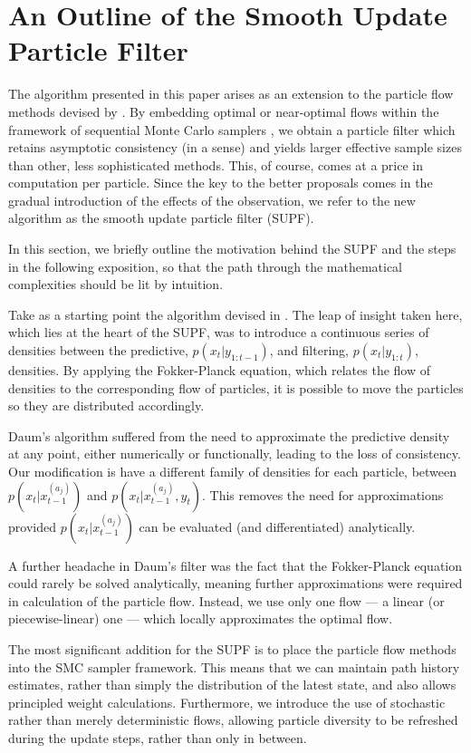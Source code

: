 \documentclass[a4paper,10pt]{article}
\begin{document}
\section{An Outline of the Smooth Update Particle Filter}

The algorithm presented in this paper arises as an extension to the particle flow methods devised by \cite{Daum2008,Daum2011d,Reich2011}. By embedding optimal or near-optimal flows within the framework of sequential Monte Carlo samplers \cite{DelMoral2006}, we obtain a particle filter which retains asymptotic consistency (in a sense) and yields larger effective sample sizes than other, less sophisticated methods. This, of course, comes at a price in computation per particle. Since the key to the better proposals comes in the gradual introduction of the effects of the observation, we refer to the new algorithm as the smooth update particle filter (SUPF).

In this section, we briefly outline the motivation behind the SUPF and the steps in the following exposition, so that the path through the mathematical complexities should be lit by intuition.

Take as a starting point the algorithm devised in \cite{Daum2008}. The leap of insight taken here, which lies at the heart of the SUPF, was to introduce a continuous series of densities between the predictive, $p(x_t|y_{1:t-1})$, and filtering, $p(x_t|y_{1:t})$, densities. By applying the Fokker-Planck equation, which relates the flow of densities to the corresponding flow of particles, it is possible to move the particles so they are distributed accordingly.

Daum's algorithm suffered from the need to approximate the predictive density at any point, either numerically or functionally, leading to the loss of consistency. Our modification is have a different family of densities for each particle, between $p(x_t|x_{t-1}^{(a_j)})$ and $p(x_t|x_{t-1}^{(a_j)}, y_{t})$. This removes the need for approximations provided $p(x_t|x_{t-1}^{(a_j)})$ can be evaluated (and differentiated) analytically.

A further headache in Daum's filter was the fact that the Fokker-Planck equation could rarely be solved analytically, meaning further approximations were required in calculation of the particle flow. Instead, we use only one flow --- a linear (or piecewise-linear) one --- which locally approximates the optimal flow. 

The most significant addition for the SUPF is to place the particle flow methods into the SMC sampler framework. This means that we can maintain path history estimates, rather than simply the distribution of the latest state, and also allows principled weight calculations. Furthermore, we introduce the use of stochastic rather than merely deterministic flows, allowing particle diversity to be refreshed during the update steps, rather than only in between.
\end{document}
